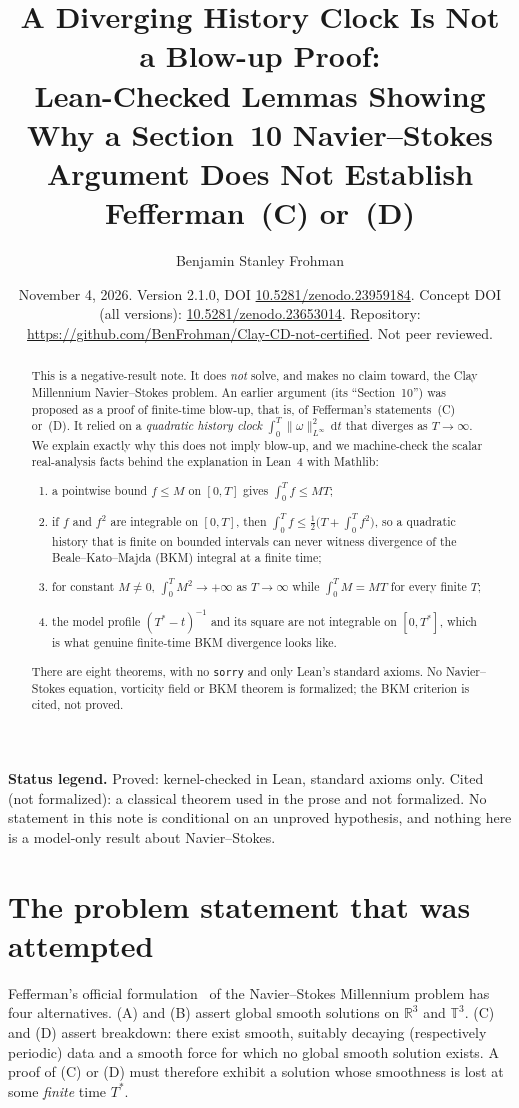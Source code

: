 \documentclass[11pt]{amsart}
\title[A history clock is not a BKM blow-up proof]{A Diverging History Clock Is Not a Blow-up Proof:\\ Lean-Checked Lemmas Showing Why a Section~10 Navier--Stokes Argument Does Not Establish Fefferman~(C) or~(D)}
\author{Benjamin Stanley Frohman}
\date{November 4, 2026. Version 2.1.0, DOI \href{https://doi.org/10.5281/zenodo.23959184}{10.5281/zenodo.23959184}. Concept DOI (all versions): \href{https://doi.org/10.5281/zenodo.23653014}{10.5281/zenodo.23653014}. Repository: \url{https://github.com/BenFrohman/Clay-CD-not-certified}. Not peer reviewed.}
\theoremstyle{remark}
\newcommand{\Proved}{\textsf{Proved}}
\newcommand{\Cited}{\textsf{Cited (not formalized)}}
\newcommand{\dd}{\,\mathrm{d}}
\newcommand{\norm}[1]{\lVert #1\rVert}
\newcommand{\Linf}{L^\infty}
\begin{document}
\begin{abstract}
This is a negative-result note. It does \emph{not} solve, and makes no claim toward, the Clay Millennium Navier--Stokes problem. An earlier argument (its ``Section~10'') was proposed as a proof of finite-time blow-up, that is, of Fefferman's statements~(C) or~(D). It relied on a \emph{quadratic history clock} $\int_0^T\norm{\omega}_{\Linf}^2\dd t$ that diverges as $T\to\infty$. We explain exactly why this does not imply blow-up, and we machine-check the scalar real-analysis facts behind the explanation in Lean~4 with Mathlib:
\begin{enumerate}[label=(\roman*),leftmargin=2em,itemsep=1pt]
\item a pointwise bound $f\le M$ on $[0,T]$ gives $\int_0^T f\le MT$;
\item if $f$ and $f^2$ are integrable on $[0,T]$, then $\int_0^T f\le \frac12\bigl(T+\int_0^T f^2\bigr)$, so a quadratic history that is finite on bounded intervals can never witness divergence of the Beale--Kato--Majda (BKM) integral at a finite time;
\item for constant $M\ne0$, $\int_0^T M^2\to+\infty$ as $T\to\infty$ while $\int_0^T M=MT$ for every finite $T$;
\item the model profile $(T^*-t)^{-1}$ and its square are not integrable on $[0,T^*]$, which is what genuine finite-time BKM divergence looks like.
\end{enumerate}
There are eight theorems, with no \texttt{sorry} and only Lean's standard axioms. No Navier--Stokes equation, vorticity field or BKM theorem is formalized; the BKM criterion is cited, not proved.
\end{abstract}
\maketitle

\noindent\textbf{Status legend.} \Proved: kernel-checked in Lean, standard axioms only. \Cited: a classical theorem used in the prose and not formalized. No statement in this note is conditional on an unproved hypothesis, and nothing here is a model-only result about Navier--Stokes.

\section{The problem statement that was attempted}
Fefferman's official formulation~\cite{fefferman} of the Navier--Stokes Millennium problem has four alternatives. (A) and (B) assert global smooth solutions on $\mathbb{R}^3$ and $\mathbb{T}^3$. (C) and (D) assert breakdown: there exist smooth, suitably decaying (respectively periodic) data and a smooth force for which no global smooth solution exists. A proof of (C) or (D) must therefore exhibit a solution whose smoothness is lost at some \emph{finite} time $T^*$.
\end{document}
